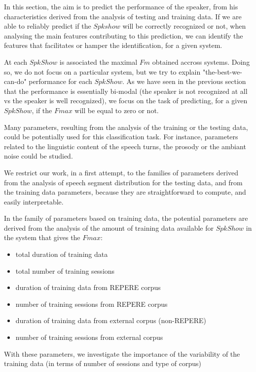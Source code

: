 In this section, the aim is to predict the performance of the speaker, from his characteristics derived from the analysis of testing and training data. If we are able to reliably predict  if the $Spkshow$ will be correctly recognized or not, when analysing the main features contributing to this prediction, we can identify the features that  facilitates or hamper the identification, for a given system.

At each $SpkShow$ is associated the maximal $Fm$ obtained accross systems. Doing so, we do not focus on a particular system, but we try to explain "the-best-we-can-do" performance for each $SpkShow$.
As we have seen in the previous section that the performance is essentially bi-modal (the speaker is not recognized at all vs the speaker is well recognized), we focus on the task of predicting, for a given $SpkShow$, if the $Fmax$ will be equal to zero or not.

Many parameters, resulting from the analysis of the training or the testing data, could be potentially used for this classification task. For instance, parameters related to the linguistic content of the speech turns, the prosody or the ambiant noise could be studied.

We restrict our work, in a first attempt, to the families of parameters derived from the analysis of speech segment distribution for the testing data, and from the training data parameters, because they are straightforward to compute, and easily interpretable.

In the family of parameters based on training data, the potential parameters are derived from the analysis of the amount of  training data available for $SpkShow$ in the system that gives the $Fmax$:
\begin{itemize}
\item total duration of training data
\item total number of training sessions
\item duration of training data from REPERE corpus
\item number of training sessions from REPERE corpus
\item duration of training data from external corpus (non-REPERE)
\item number of training sessions from external corpus
\end{itemize}
With these parameters, we investigate the importance of the variability of the training data (in terms of number of sessions and type of corpus)

